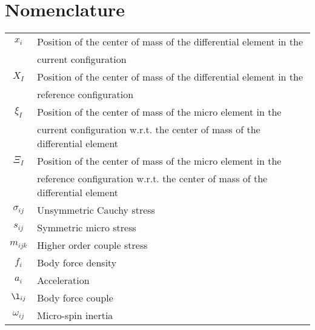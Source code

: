 \section{Nomenclature}

\begin{table}[htb!]
\centering
\begin{tabular}{|c|l|}
\hline
$x_i$ & Position of the center of mass of the differential element in the\\
& current configuration\\
\hline
$X_I$ & Position of the center of mass of the differential element in the\\
& reference configuration\\
\hline
$\xi_I$ & Position of the center of mass of the micro element in the\\
& current configuration w.r.t. the center of mass of the differential element\\
\hline
$\Xi_I$ & Position of the center of mass of the micro element in the\\
& reference configuration w.r.t. the center of mass of the differential element\\
\hline
$\sigma_{ij}$ & Unsymmetric Cauchy stress\\
\hline
$s_{ij}$ & Symmetric micro stress\\
\hline
$m_{ijk}$ & Higher order couple stress\\
\hline
$f_{i}$ & Body force density\\
\hline
$a_{i}$ & Acceleration\\
\hline
$\l_{ij}$ & Body force couple\\
\hline
$\omega_{ij}$ & Micro-spin inertia\\
\hline
\end{tabular}
\end{table}

\FloatBarrier